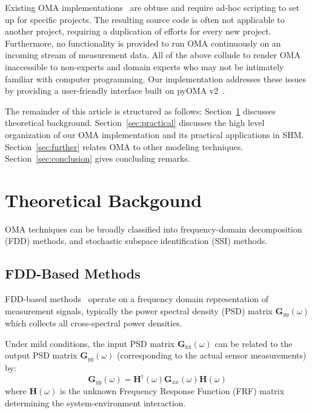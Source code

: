 \documentclass[journal,a4paper]{IEEEtran}
\begin{document}

Existing OMA implementations~\cite{pyoma2} are obtuse and require ad-hoc scripting to set up for specific projects. The resulting source code is often not applicable to another project, requiring a duplication of efforts for every new project. Furthermore, no functionality is provided to run OMA continuously on an incoming stream of measurement data. All of the above collude to render OMA inaccessible to non-experts and domain experts who may not be intimately familiar with computer programming. Our implementation addresses these issues by providing a user-friendly interface built on pyOMA v2~\cite{pyoma2}.

The remainder of this article is structured as follows: Section~\ref{sec:theory} discusses theoretical background. Section~\ref{sec:practical} discusses the high level organization of our OMA implementation and its practical applications in SHM. Section~\ref{sec:further} relates OMA to other modeling techniques. Section~\ref{sec:conclusion} gives concluding remarks.

\section{Theoretical Backgound}\label{sec:theory}

OMA techniques can be broadly classified into frequency-domain decomposition (FDD) methods, and stochastic subspace identification (SSI) methods.

\subsection{FDD-Based Methods}\label{sec:fdd}

FDD-based methods~\cite{Brincker2000OutputonlyMA,Brincker2001DampingEB} operate on a frequency domain representation of measurement signals, typically the power spectral density (PSD) matrix $\mathbf{G}_{yy}\left(\omega \right)$ which collects all cross-spectral power densities.

Under mild conditions, the input PSD matrix ${\mathbf{G}}_{\mathrm{xx}}\left(\omega \right)$ can be related to the output PSD matrix ${\mathbf{G}}_{yy}\left(\omega \right)$ (corresponding to the actual sensor measurements) by:
\[
\mathbf{G}_{yy}\left(\omega \right) = 
\mathbf{H}^{\dagger}\left(\omega \right)\mathbf{G}_{xx}\left(\omega \right)\mathbf{H}\left(\omega \right)
\]
where $\mathbf{H}(\omega)$ is the unknown Frequency Response Function (FRF) matrix determining the system-environment interaction.
\end{document}
